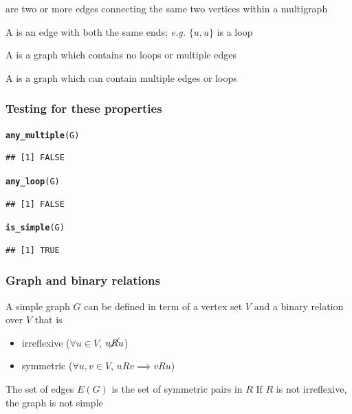 \documentclass[aspectratio=169]{beamer}\usepackage[]{graphicx}\usepackage[]{xcolor}
\makeatletter
\newcommand{\hldef}[1]{\textcolor[rgb]{0.345,0.345,0.345}{#1}}%
\newcommand{\hlkwd}[1]{\textcolor[rgb]{0.737,0.353,0.396}{\textbf{#1}}}%
\newenvironment{kframe}{%
 \def\at@end@of@kframe{}%
 \ifinner\ifhmode%
  \def\at@end@of@kframe{\end{minipage}}%
  \begin{minipage}{\columnwidth}%
 \fi\fi%
 \def\FrameCommand##1{\hskip\@totalleftmargin \hskip-\fboxsep
 \colorbox{shadecolor}{##1}\hskip-\fboxsep
     \hskip-\linewidth \hskip-\@totalleftmargin \hskip\columnwidth}%
 \MakeFramed {\advance\hsize-\width
   \@totalleftmargin\z@ \linewidth\hsize
   \@setminipage}}%
 {\par\unskip\endMakeFramed%
 \at@end@of@kframe}
\newenvironment{knitrout}{}{} %
\makeatother
\begin{document}
\begin{frame}
	\begin{definition}
	 are two or more edges connecting the same two vertices within a multigraph
	\end{definition}
	\vfill
	\begin{definition}[Loop]
	A  is an edge with both the same ends; \emph{e.g.} $\{u,u\}$ is a loop
	\end{definition}
	\vfill
	\begin{definition}
		A  is a graph which contains no loops or multiple edges
	\end{definition}
	\vfill
	\begin{definition}[Multigraph]
		A  is a graph which can contain multiple edges or loops
	\end{definition}
\end{frame}


\begin{frame}[fragile]\frametitle{Testing for these properties}
\begin{knitrout}
\color{fgcolor}\begin{kframe}
\begin{alltt}
\hlkwd{any_multiple}\hldef{(G)}
\end{alltt}
\begin{verbatim}
## [1] FALSE
\end{verbatim}
\begin{alltt}
\hlkwd{any_loop}\hldef{(G)}
\end{alltt}
\begin{verbatim}
## [1] FALSE
\end{verbatim}
\begin{alltt}
\hlkwd{is_simple}\hldef{(G)}
\end{alltt}
\begin{verbatim}
## [1] TRUE
\end{verbatim}
\end{kframe}
\end{knitrout}
\end{frame}



\begin{frame}\frametitle{Graph and binary relations}
A simple graph $G$ can be defined in term of a vertex set $V$ and a binary relation over $V$ that is
	\begin{itemize}
		\item irreflexive ($\forall u\in V$, $u\cancel Ru$)
		\item symmetric ($\forall u,v\in V$, $uRv\implies vRu$)
	\end{itemize}
	\vfill
	The set of edges $E(G)$ is the set of symmetric pairs in $R$
	\vfill
	If $R$ is not irreflexive, the graph is not simple
\end{frame}
\end{document}
